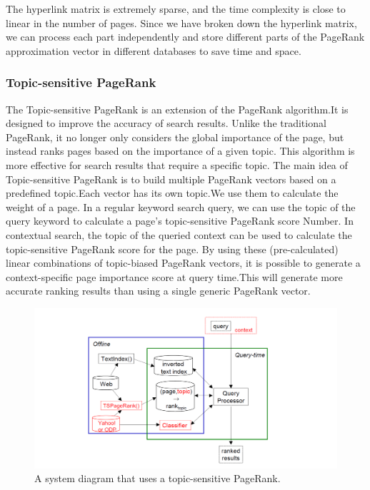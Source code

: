 \documentclass[lettersize,journal,12pt,conference]{IEEEtran}
\begin{document}
The hyperlink matrix is extremely sparse, and the time complexity is close to linear in the number of pages. Since we have broken down the hyperlink matrix, we can process each part independently and store different parts of the PageRank approximation vector in different databases to save time and space.



\subsubsection{ Topic-sensitive PageRank}

The Topic-sensitive PageRank is an extension of the PageRank algorithm.It is designed to improve the accuracy of search results. Unlike the traditional PageRank, it no longer only considers the global importance of the page, but instead ranks pages based on the importance of a given topic. This algorithm is more effective for search results that require a specific topic.
The main idea of Topic-sensitive PageRank is to build multiple PageRank vectors based on a predefined topic.Each vector has its own topic.We use them to calculate the weight of a page. In a regular keyword search query, we can use the topic of the query keyword to calculate a page's topic-sensitive PageRank score Number. In contextual search, the topic of the queried context can be used to calculate the topic-sensitive PageRank score for the page. By using these (pre-calculated) linear combinations of topic-biased PageRank vectors, it is possible to generate a context-specific page importance score at query time.This will generate more accurate ranking results than using a single generic PageRank vector.
\begin{figure}[!t]
	\centering
	\includegraphics[width=\textwidth]{images/fig3.png}
	\caption{A system diagram that uses a topic-sensitive PageRank.}
	\label{fig3}
\end{figure}
\end{document}
